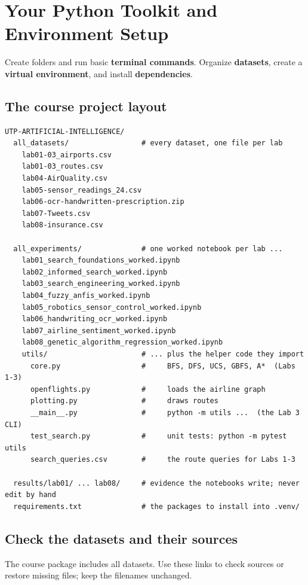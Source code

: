 \chapter{Your Python Toolkit and Environment Setup}
\label{ch:python}

\chapterguide%
  {Create folders and run basic \textbf{terminal commands}.}
  {Organize \textbf{datasets}, create a \textbf{virtual environment}, and install \textbf{dependencies}.}

\section{The course project layout}
\begin{lstlisting}[style=mlterminal]
UTP-ARTIFICIAL-INTELLIGENCE/
  all_datasets/                 # every dataset, one file per lab
    lab01-03_airports.csv
    lab01-03_routes.csv
    lab04-AirQuality.csv
    lab05-sensor_readings_24.csv
    lab06-ocr-handwritten-prescription.zip
    lab07-Tweets.csv
    lab08-insurance.csv

  all_experiments/              # one worked notebook per lab ...
    lab01_search_foundations_worked.ipynb
    lab02_informed_search_worked.ipynb
    lab03_search_engineering_worked.ipynb
    lab04_fuzzy_anfis_worked.ipynb
    lab05_robotics_sensor_control_worked.ipynb
    lab06_handwriting_ocr_worked.ipynb
    lab07_airline_sentiment_worked.ipynb
    lab08_genetic_algorithm_regression_worked.ipynb
    utils/                      # ... plus the helper code they import
      core.py                   #     BFS, DFS, UCS, GBFS, A*  (Labs 1-3)
      openflights.py            #     loads the airline graph
      plotting.py               #     draws routes
      __main__.py               #     python -m utils ...  (the Lab 3 CLI)
      test_search.py            #     unit tests: python -m pytest utils
      search_queries.csv        #     the route queries for Labs 1-3

  results/lab01/ ... lab08/     # evidence the notebooks write; never edit by hand
  requirements.txt              # the packages to install into .venv/
\end{lstlisting}

\section{Check the datasets and their sources}

The course package includes all datasets. Use these links to check sources or restore
missing files; keep the filenames unchanged.

